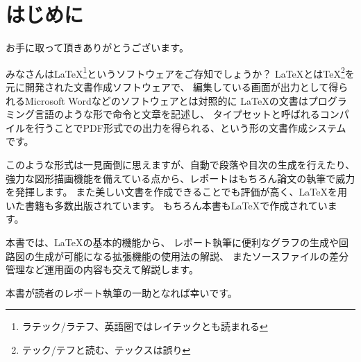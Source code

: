 \documentclass[uplatex,b5j]{jsbook}
\begin{document}
\tableofcontents
\clearpage

\chapter{はじめに}
	お手に取って頂きありがとうございます。

	みなさんは\LaTeX \footnote{ラテック/ラテフ、英語圏ではレイテックとも読まれる}というソフトウェアをご存知でしょうか？
	\LaTeX とは\TeX \footnote{テック/テフと読む、テックスは誤り}を元に開発された文書作成ソフトウェアで、
	編集している画面が出力として得られるMicrosoft Wordなどのソフトウェアとは対照的に
	\LaTeX の文書はプログラミング言語のような形で命令と文章を記述し、
	タイプセットと呼ばれるコンパイルを行うことでPDF形式での出力を得られる、という形の文書作成システムです。

	このような形式は一見面倒に思えますが、自動で段落や目次の生成を行えたり、
	強力な図形描画機能を備えている点から、レポートはもちろん論文の執筆で威力を発揮します。
	また美しい文書を作成できることでも評価が高く、\LaTeX を用いた書籍も多数出版されています。
	もちろん本書も\LaTeX で作成されています。

	本書では、\LaTeX の基本的機能から、
	レポート執筆に便利なグラフの生成や回路図の生成が可能になる拡張機能の使用法の解説、
	またソースファイルの差分管理など運用面の内容も交えて解説します。

	本書が読者のレポート執筆の一助となれば幸いです。
\end{document}
